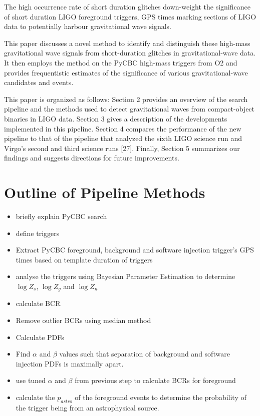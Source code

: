 \documentclass[%
 reprint,
 amsmath,amssymb,
 aps,
]{revtex4}
\begin{document}
The high occurrence rate of short duration glitches down-weight the significance of short duration LIGO foreground triggers, GPS times marking sections of LIGO data to potentially harbour gravitational wave signals.

This paper discusses a novel method to identify and distinguish these high-mass gravitational wave signals from short-duration glitches in gravitational-wave data. It then employs the method on the PyCBC high-mass triggers from O2 and provides frequentistic estimates of the significance of various gravitational-wave candidates and events. 

This paper is organized as follows: Section 2 provides an overview of the search
pipeline and the methods used to detect gravitational waves from compact-object
binaries in LIGO data. Section 3 gives a description of the developments implemented
in this pipeline. Section 4 compares the performance of the new pipeline to that of the
pipeline that analyzed the sixth LIGO science run and Virgo’s second and third science
runs [27]. Finally, Section 5 summarizes our findings and suggests directions for future
improvements.

\section{\label{sec:OutlineOfPipelineMethods}Outline of Pipeline Methods}

\begin{itemize}
    \item briefly explain PyCBC search
    \item define triggers
    \item Extract PyCBC foreground, background and software injection trigger's GPS times based on template duration of triggers
    \item analyse the triggers using Bayesian Parameter Estimation to determine $\log{Z_s}$, $\log{Z_g}$ and $\log{Z_n}$
    \item calculate BCR
    \item Remove outlier BCRs using median method
    \item Calculate PDFs
    \item Find $\alpha$ and $\beta$ values such that separation of background and software injection PDFs is maximally apart.
    \item use tuned $\alpha$ and $\beta$ from previous step to calculate BCRs for foreground
    \item calculate the $p_{astro}$ of the foreground events to determine the probability of the trigger being from an astrophysical source. 
\end{itemize}
\end{document}
